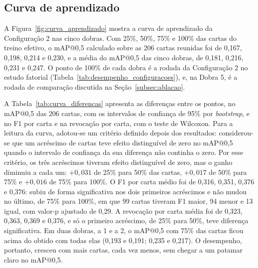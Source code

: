 \documentclass[
    12pt,                %
    openright,           %
    oneside,             %
    a4paper,             %
    english,             %
    brazil               %
]{abntex2}
\begin{document}
\subsection{Curva de aprendizado}
\label{subsec:res_curva}

A Figura~\ref{fig:curva_aprendizado} mostra a curva de aprendizado da
Configuração 2 nas cinco dobras. Com 25\%, 50\%, 75\% e 100\% das cartas
do treino efetivo, o mAP@0,5 calculado sobre as 206 cartas reunidas foi
de 0,167, 0,198, 0,214 e 0,230, e a média do mAP@0,5 das cinco dobras,
de 0,181, 0,216, 0,231 e 0,247. O ponto de 100\% de cada
dobra é a rodada da Configuração 2 no estudo fatorial
(Tabela~\ref{tab:desempenho_configuracoes}), e, na Dobra 5, é a rodada de
comparação discutida na Seção~\ref{subsec:ablacao}.

A Tabela~\ref{tab:curva_diferencas} apresenta as diferenças entre os
pontos, no mAP@0,5 das 206 cartas, com os intervalos de confiança de
95\% por \textit{bootstrap}, e no F1 por carta e na revocação por carta,
com o teste de Wilcoxon. Para a leitura da curva, adotou-se um critério
definido depois dos resultados: considerou-se que um acréscimo de
cartas teve efeito distinguível de zero no mAP@0,5 quando o intervalo de
confiança da sua diferença não continha o zero. Por esse critério, os
três acréscimos tiveram efeito distinguível de zero, mas o ganho
diminuiu a cada um: $+0{,}031$ de 25\% para 50\% das cartas, $+0{,}017$
de 50\% para 75\% e $+0{,}016$ de 75\% para 100\%. O F1 por carta médio
foi de 0,316, 0,351, 0,376 e 0,376: subiu de forma significativa nos
dois primeiros acréscimos e não mudou no último, de 75\% para 100\%, em
que 99 cartas tiveram F1 maior, 94 menor e 13 igual, com valor-p
ajustado de 0,29. A revocação por carta média foi de 0,323, 0,363,
0,369 e 0,376, e só o primeiro acréscimo, de 25\% para 50\%, teve
diferença significativa. Em duas dobras, a 1 e a 2, o mAP@0,5 com 75\%
das cartas ficou acima do obtido com todas elas (0,193 e 0,191; 0,235 e 0,217). O desempenho,
portanto, cresceu com mais cartas, cada vez menos, sem chegar a um
patamar claro no mAP@0,5.
\end{document}
